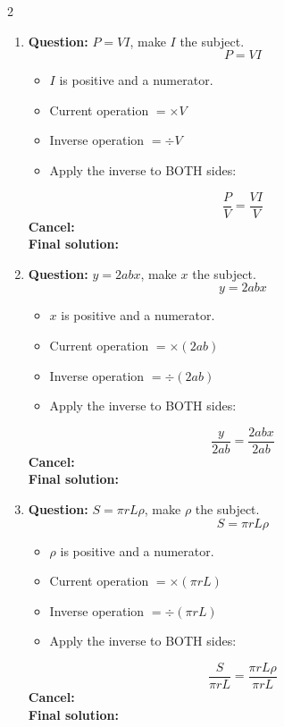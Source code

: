 \documentclass[11pt]{article}
\begin{document}
\begin{multicols}{2}
\begin{enumerate}[leftmargin=*, itemsep=10pt]
\item \textbf{Question:} \( P = VI \), make \( I \) the subject.
\[
P=VI
\]
\begin{itemize}[leftmargin=*, itemsep=2pt]
\item \(I\) is positive and a numerator.
\item Current operation \(= \times V\)
\item Inverse operation \(= \div V\)
\item Apply the inverse to BOTH sides:
\end{itemize}
\[
\frac{P}{V}=\frac{VI}{V}
\]
\textbf{Cancel:} \\[1.5cm]
\textbf{Final solution:}\\[1.5cm]

\newpage
\item \textbf{Question:} \( y = 2abx \), make \( x \) the subject.
\[
y=2abx
\]
\begin{itemize}[leftmargin=*, itemsep=2pt]
\item \(x\) is positive and a numerator.
\item Current operation \(= \times (2ab)\)
\item Inverse operation \(= \div (2ab)\)
\item Apply the inverse to BOTH sides:
\end{itemize}
\[
\frac{y}{2ab}=\frac{2abx}{2ab}
\]
\textbf{Cancel:} \\[1.5cm]
\textbf{Final solution:}\\[1.5cm]

\item \textbf{Question:} \( S = \pi rL\rho \), make \( \rho \) the subject.
\[
S=\pi rL\rho
\]
\begin{itemize}[leftmargin=*, itemsep=2pt]
\item \(\rho\) is positive and a numerator.
\item Current operation \(= \times (\pi rL)\)
\item Inverse operation \(= \div (\pi rL)\)
\item Apply the inverse to BOTH sides:
\end{itemize}
\[
\frac{S}{\pi rL}=\frac{\pi rL\rho}{\pi rL}
\]
\textbf{Cancel:} \\[1.5cm]
\textbf{Final solution:}\\[1.5cm]


\end{enumerate}
\end{multicols}
\end{document}
